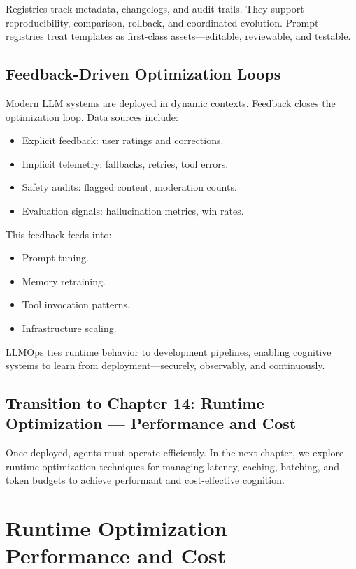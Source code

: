 \documentclass{book}
\begin{document}
Registries track metadata, changelogs, and audit trails. They support reproducibility, comparison, rollback, and coordinated evolution. Prompt registries treat templates as first-class assets—editable, reviewable, and testable.

\section{Feedback-Driven Optimization Loops}

Modern LLM systems are deployed in dynamic contexts. Feedback closes the optimization loop. Data sources include:

\begin{itemize}
  \item Explicit feedback: user ratings and corrections.
  \item Implicit telemetry: fallbacks, retries, tool errors.
  \item Safety audits: flagged content, moderation counts.
  \item Evaluation signals: hallucination metrics, win rates.
\end{itemize}

This feedback feeds into:

\begin{itemize}
  \item Prompt tuning.
  \item Memory retraining.
  \item Tool invocation patterns.
  \item Infrastructure scaling.
\end{itemize}

LLMOps ties runtime behavior to development pipelines, enabling cognitive systems to learn from deployment—securely, observably, and continuously.

\section*{Transition to Chapter 14: Runtime Optimization — Performance and Cost}

Once deployed, agents must operate efficiently. In the next chapter, we explore runtime optimization techniques for managing latency, caching, batching, and token budgets to achieve performant and cost-effective cognition.

\chapter{Runtime Optimization — Performance and Cost}
\end{document}
